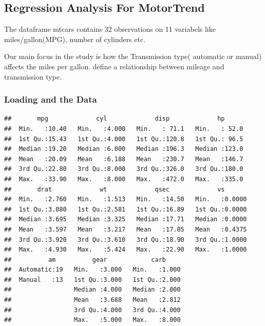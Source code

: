 \documentclass[
]{article}
\author{}
\date{\vspace{-2.5em}}
\newenvironment{Shaded}{\begin{snugshade}}{\end{snugshade}}
\newcommand{\DataTypeTok}[1]{\textcolor[rgb]{0.13,0.29,0.53}{#1}}
\newcommand{\KeywordTok}[1]{\textcolor[rgb]{0.13,0.29,0.53}{\textbf{#1}}}
\newcommand{\NormalTok}[1]{#1}
\newcommand{\OperatorTok}[1]{\textcolor[rgb]{0.81,0.36,0.00}{\textbf{#1}}}
\newcommand{\StringTok}[1]{\textcolor[rgb]{0.31,0.60,0.02}{#1}}
\begin{document}
\hypertarget{regression-analysis-for-motortrend}{%
\subsection{Regression Analysis For
MotorTrend}\label{regression-analysis-for-motortrend}}

The dataframe mtcars contains 32 observations on 11 variabels like
miles/gallon(MPG), number of cylinders etc.

Our main focus in the study is how the Transmission type( automatic or
manual) affects the miles per gallon. define a relationship between
mileage and transmission type.

\hypertarget{loading-and-the-data}{%
\subsubsection{Loading and the Data}\label{loading-and-the-data}}

\begin{Shaded}
\end{Shaded}

\begin{verbatim}
##       mpg             cyl             disp             hp       
##  Min.   :10.40   Min.   :4.000   Min.   : 71.1   Min.   : 52.0  
##  1st Qu.:15.43   1st Qu.:4.000   1st Qu.:120.8   1st Qu.: 96.5  
##  Median :19.20   Median :6.000   Median :196.3   Median :123.0  
##  Mean   :20.09   Mean   :6.188   Mean   :230.7   Mean   :146.7  
##  3rd Qu.:22.80   3rd Qu.:8.000   3rd Qu.:326.0   3rd Qu.:180.0  
##  Max.   :33.90   Max.   :8.000   Max.   :472.0   Max.   :335.0  
##       drat             wt             qsec             vs        
##  Min.   :2.760   Min.   :1.513   Min.   :14.50   Min.   :0.0000  
##  1st Qu.:3.080   1st Qu.:2.581   1st Qu.:16.89   1st Qu.:0.0000  
##  Median :3.695   Median :3.325   Median :17.71   Median :0.0000  
##  Mean   :3.597   Mean   :3.217   Mean   :17.85   Mean   :0.4375  
##  3rd Qu.:3.920   3rd Qu.:3.610   3rd Qu.:18.90   3rd Qu.:1.0000  
##  Max.   :4.930   Max.   :5.424   Max.   :22.90   Max.   :1.0000  
##          am          gear            carb      
##  Automatic:19   Min.   :3.000   Min.   :1.000  
##  Manual   :13   1st Qu.:3.000   1st Qu.:2.000  
##                 Median :4.000   Median :2.000  
##                 Mean   :3.688   Mean   :2.812  
##                 3rd Qu.:4.000   3rd Qu.:4.000  
##                 Max.   :5.000   Max.   :8.000
\end{verbatim}
\end{document}
